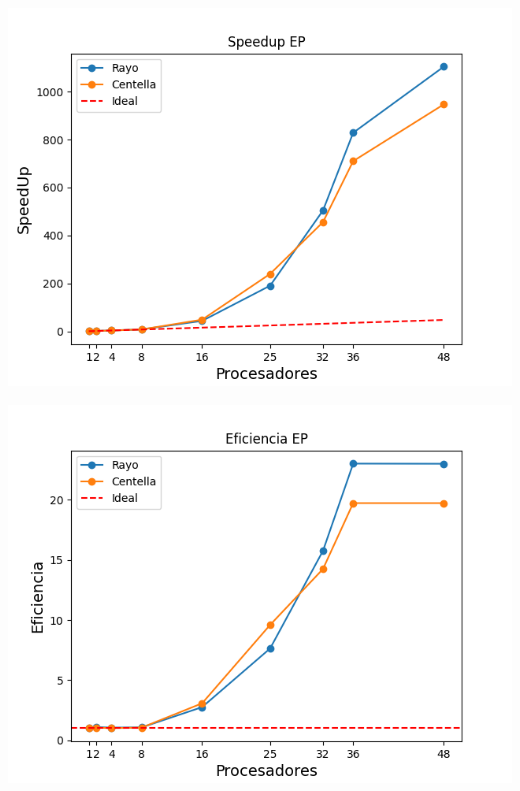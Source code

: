 \begin{center}
 \centering
 \begin{minipage}[b]{.49\textwidth}
  \includegraphics[width=1\linewidth]{plots/speed-up-ep.png}
  \label{ep:speedup}
 \end{minipage}
 \begin{minipage}[b]{.49\textwidth}
  \includegraphics[width=1\linewidth]{plots/efficiency-ep.png}
 \end{minipage}
\end{center}

